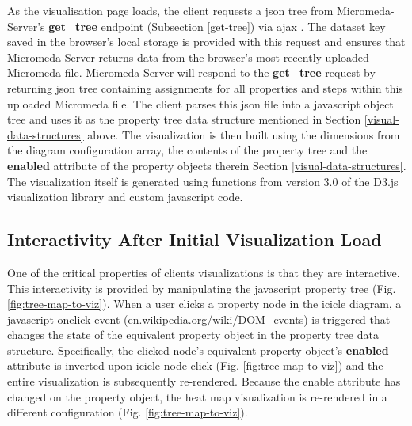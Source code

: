 As the visualisation page loads, the client requests a \gls{json} tree from Micromeda-Server's \textbf{get\_tree} endpoint (Subsection \ref{get-tree}) via \gls{ajax} . The dataset key saved in the browser's local storage is provided with this request and ensures that Micromeda-Server returns data from the browser's most recently uploaded Micromeda file. Micromeda-Server will respond to the \textbf{get\_tree} request by returning \gls{json} tree containing assignments for all properties and steps within this uploaded Micromeda file. The client parses this \gls{json} file into a \gls{javascript} object tree and uses it as the property tree data structure mentioned in Section \ref{visual-data-structures} above. The visualization is then built using the dimensions from the diagram configuration array, the contents of the property tree and the \textbf{enabled} attribute of the property objects therein Section \ref{visual-data-structures}. The visualization itself is generated using functions from version 3.0 of the D3.js visualization library \cite{bostock2015d3} and custom \gls{javascript} code.

\subsection{Interactivity After Initial Visualization Load}

One of the critical properties of clients visualizations is that they are interactive. This interactivity is provided by manipulating the \gls{javascript} property tree (Fig. \ref{fig:tree-map-to-viz}). When a user clicks a property node in the icicle diagram, a \gls{javascript} onclick event \cite{dom-events} (\href{en.wikipedia.org/wiki/DOM\_events}{en.wikipedia.org/wiki/DOM\_events}) is triggered that changes the state of the equivalent property object in the property tree data structure. Specifically, the clicked node's equivalent property object's \textbf{enabled} attribute is inverted upon icicle node click (Fig. \ref{fig:tree-map-to-viz}) and the entire visualization is subsequently re-rendered. Because the enable attribute has changed on the property object, the heat map visualization is re-rendered in a different configuration (Fig. \ref{fig:tree-map-to-viz}). 

